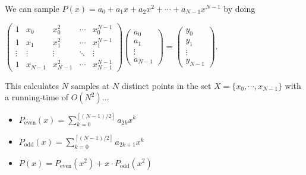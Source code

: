 \documentclass{beamer}
\begin{document}
\begin{frame}
	We can sample $P(x) = a_0+a_1x+a_2x^2+\cdots+a_{N-1}x^{N-1}$ by doing \\
	\bigskip
	\begin{centering}{
		$\begin{pmatrix}
			1 & x_0 & x_0^2 & \cdots & x_0^{N-1}\\ 
			1 & x_1 & x_1^2& \cdots & x_1^{N-1}\\ 
			\vdots & \vdots & \vdots & \ddots & \vdots\\ 
			1 & x_{N-1}  & x_{N-1}^{2}& \cdots & x_{N-1}^{N-1}
		\end{pmatrix}
		\begin{pmatrix}
			a_0\\ 
			a_1\\ 
			\vdots\\ 
			a_{N-1}
		\end{pmatrix}
		=
		\begin{pmatrix}
			y_0\\ 
			y_1\\ 
			\vdots\\ 
			y_{N-1}
		\end{pmatrix}$.
	}

\end{centering}

\bigskip
This calculates $N$ samples at $N$ distinct points in the set $X = \{x_0,\cdots,x_{N-1}\}$ with a running-time of $O(N^2)$...
\end{frame}

\begin{frame}

\bigskip
{}
\begin{itemize}
\item{$P_{\text{even}}(x)=\displaystyle \sum_{k=0}^{[(N-1)/2]} a_{2k}x^k$}
\item{$P_{\text{odd}}(x)=\displaystyle \sum_{k=0}^{[(N-1)/2]} a_{2k+1}x^k$}
\item{$P(x) = P_{\text{even}}(x^2)+x\cdot P_{\text{odd}}(x^2)$}
\end{itemize}
\end{frame}
\end{document}
